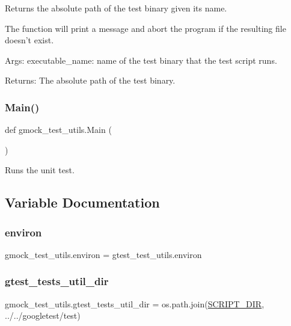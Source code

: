 \begin{DoxyVerb}Returns the absolute path of the test binary given its name.

The function will print a message and abort the program if the resulting file
doesn't exist.

Args:
  executable_name: name of the test binary that the test script runs.

Returns:
  The absolute path of the test binary.
\end{DoxyVerb}
 \mbox{\label{namespacegmock__test__utils_ad79dc6aea3727ee23b5f5c454ef0d78a}} 
\subsubsection{\texorpdfstring{Main()}{Main()}}
{\footnotesize\ttfamily def gmock\+\_\+test\+\_\+utils.\+Main (\begin{DoxyParamCaption}{ }\end{DoxyParamCaption})}

\begin{DoxyVerb}Runs the unit test.\end{DoxyVerb}
 

\subsection{Variable Documentation}
\mbox{\label{namespacegmock__test__utils_a6f0938b5e8839ebc847b52a38f4d35e3}} 
\subsubsection{\texorpdfstring{environ}{environ}}
{\footnotesize\ttfamily gmock\+\_\+test\+\_\+utils.\+environ = gtest\+\_\+test\+\_\+utils.\+environ}

\mbox{\label{namespacegmock__test__utils_af6d94170502149e7f99cfa73ddc13c00}} 
\subsubsection{\texorpdfstring{gtest\_tests\_util\_dir}{gtest\_tests\_util\_dir}}
{\footnotesize\ttfamily gmock\+\_\+test\+\_\+utils.\+gtest\+\_\+tests\+\_\+util\+\_\+dir = os.\+path.\+join(\mbox{\hyperlink{namespacegmock__test__utils_a4ef94affd9d889f78d67be80017eeddd}{S\+C\+R\+I\+P\+T\+\_\+\+D\+IR}}, \textquotesingle{}../../googletest/test\textquotesingle{})}

